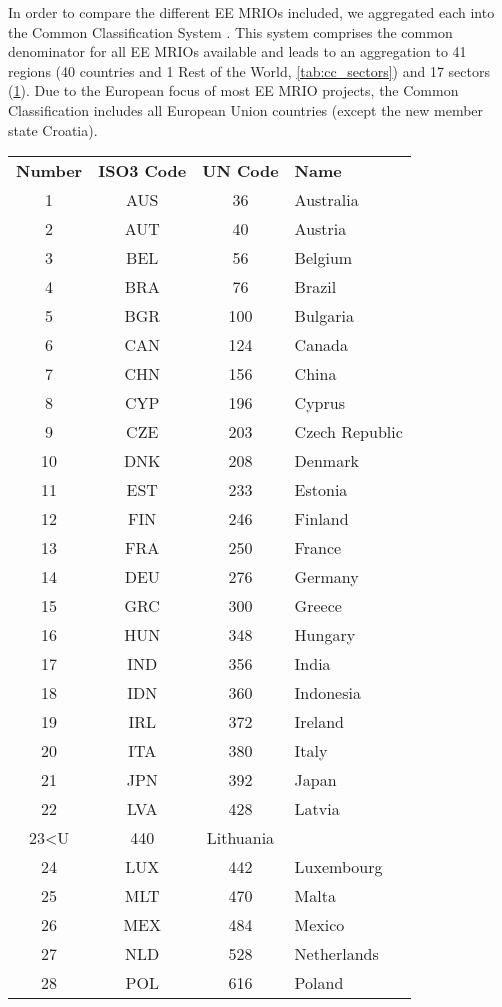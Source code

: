 In order to compare the different EE MRIOs included, we aggregated each into the Common Classification System \cite{Steen_Olsen_2014}. 
This system comprises the common denominator for all EE MRIOs available and leads to an aggregation to 41 regions (40 countries and 1 Rest of the World, \ref{tab:cc_sectors}) and 17 sectors (\ref{tab:cc_regions}). 
Due to the European focus of most EE MRIO projects, the Common Classification includes all European Union countries (except the new member state Croatia).


\begin{table}
\label{tab:cc_regions}
\begin{tabular}{ c c c l }
\textbf{Number} & \textbf{ISO3 Code} & \textbf{UN Code} & \textbf{Name}\\
1&AUS & 36 & Australia\\
2&AUT & 40 & Austria\\
3&BEL & 56 & Belgium\\
4&BRA & 76 & Brazil\\
5&BGR & 100 & Bulgaria\\
6&CAN & 124 & Canada\\
7&CHN & 156 & China\\
8&CYP & 196 & Cyprus\\
9&CZE & 203 & Czech Republic\\
10&DNK & 208 & Denmark\\
11&EST & 233 & Estonia\\
12&FIN & 246 & Finland\\
13&FRA & 250 & France\\
14&DEU & 276 & Germany\\
15&GRC & 300 & Greece\\
16&HUN & 348 & Hungary\\
17&IND & 356 & India\\
18&IDN & 360 & Indonesia\\
19&IRL & 372 & Ireland\\
20&ITA & 380 & Italy\\
21&JPN & 392 & Japan\\
22&LVA & 428 & Latvia\\
23<U & 440 & Lithuania\\
24&LUX & 442 & Luxembourg\\
25&MLT & 470 & Malta\\
26&MEX & 484 & Mexico\\
27&NLD & 528 & Netherlands\\
28&POL & 616 & Poland\\

\end{tabular}
\end{table}
